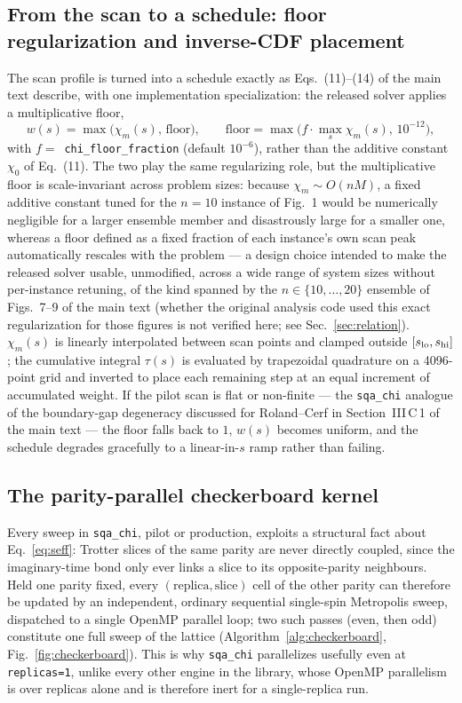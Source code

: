 \documentclass[11pt]{article}
\newcommand{\chim}{\chi_{m}}
\begin{document}
\subsection{From the scan to a schedule: floor regularization and inverse-CDF placement}
The scan profile is turned into a schedule exactly as Eqs.~(11)--(14) of the main text describe,
with one implementation specialization: the released solver applies a multiplicative floor,
\begin{equation}
w(s)=\max\bigl(\chim(s),\,\text{floor}\bigr),
\qquad
\text{floor}=\max\bigl(f\cdot\max_s\chim(s),\,10^{-12}\bigr),
\label{eq:floor-note}
\end{equation}
with $f=$~\texttt{chi\_floor\_fraction} (default $10^{-6}$), rather than the additive constant
$\chi_0$ of Eq.~(11). The two play the same regularizing role, but the multiplicative floor is
scale-invariant across problem sizes: because $\chim\sim O(nM)$, a fixed additive constant tuned
for the $n=10$ instance of Fig.~1 would be numerically negligible for a larger ensemble member
and disastrously large for a smaller one, whereas a floor defined as a fixed fraction of each
instance's own scan peak automatically rescales with the problem --- a design choice intended to
make the released solver usable, unmodified, across a wide range of system sizes without
per-instance retuning, of the kind spanned by the $n\in\{10,\dots,20\}$ ensemble of Figs.~7--9 of
the main text (whether the original analysis code used this exact regularization for those figures
is not verified here; see Sec.~\ref{sec:relation}).
$\chim(s)$ is linearly interpolated between scan points and clamped outside $[s_{\rm lo},s_{\rm
hi}]$; the cumulative integral $\tau(s)$ is evaluated by trapezoidal quadrature on a 4096-point
grid and inverted to place each remaining step at an equal increment of accumulated weight. If
the pilot scan is flat or non-finite --- the \texttt{sqa\_chi} analogue of the boundary-gap
degeneracy discussed for Roland--Cerf in Section~III\,C\,1 of the main text --- the floor falls
back to $1$, $w(s)$ becomes uniform, and the schedule degrades gracefully to a linear-in-$s$ ramp
rather than failing.

\subsection{The parity-parallel checkerboard kernel}
\label{sec:kernel-note}
Every sweep in \texttt{sqa\_chi}, pilot or production, exploits a structural fact about
Eq.~\eqref{eq:seff}: Trotter slices of the same parity are never directly coupled, since the
imaginary-time bond only ever links a slice to its opposite-parity neighbours. Held one parity
fixed, every $(\text{replica},\text{slice})$ cell of the other parity can therefore be updated by
an independent, ordinary sequential single-spin Metropolis sweep, dispatched to a single OpenMP
parallel loop; two such passes (even, then odd) constitute one full sweep of the lattice
(Algorithm~\ref{alg:checkerboard}, Fig.~\ref{fig:checkerboard}). This is why \texttt{sqa\_chi}
parallelizes usefully even at \texttt{replicas=1}, unlike every other engine in the library, whose
OpenMP parallelism is over replicas alone and is therefore inert for a single-replica run.
\end{document}
